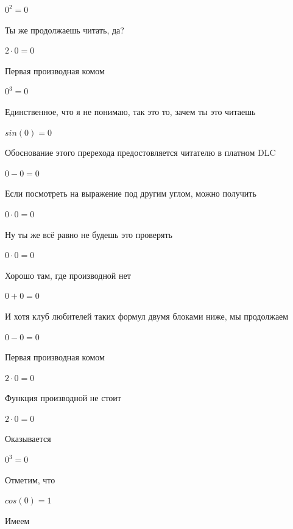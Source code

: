 \documentclass[12pt,a4paper,fleqn]{article}
\begin{document}
\begin{center}$0^{2} = 0$\end{center}
Ты же продолжаешь читать, да?

\begin{center}$2 \cdot 0 = 0$\end{center}
Первая производная комом\cite{link2}

\begin{center}$0^{3} = 0$\end{center}
Единственное, что я не понимаю, так это то, зачем ты это читаешь

\begin{center}$sin(0) = 0$\end{center}
Обоснование этого пререхода предостовляется читателю в платном DLC

\begin{center}$0-0 = 0$\end{center}
Если посмотреть на выражение под другим углом, можно получить

\begin{center}$0 \cdot 0 = 0$\end{center}
Ну ты же всё равно не будешь это проверять

\begin{center}$0 \cdot 0 = 0$\end{center}
Хорошо там, где производной нет\cite{link2}

\begin{center}$0+0 = 0$\end{center}
И хотя клуб любителей таких формул двумя блоками ниже, мы продолжаем

\begin{center}$0-0 = 0$\end{center}
Первая производная комом\cite{link2}

\begin{center}$2 \cdot 0 = 0$\end{center}
Функция производной не стоит\cite{link2}

\begin{center}$2 \cdot 0 = 0$\end{center}
Оказывается

\begin{center}$0^{3} = 0$\end{center}
Отметим, что

\begin{center}$cos(0) = 1$\end{center}
Имеем
\end{document}
